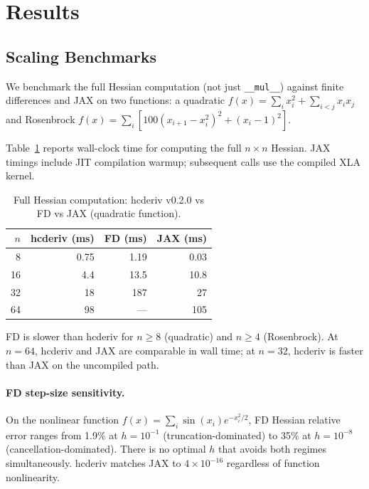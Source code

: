 \documentclass[11pt]{article}
\begin{document}
\section{Results}

\subsection{Scaling Benchmarks}

We benchmark the full Hessian computation (not just \texttt{\_\_mul\_\_}) against
finite differences and JAX on two functions: a quadratic
$f(x) = \sum_i x_i^2 + \sum_{i<j} x_i x_j$ and Rosenbrock
$f(x) = \sum_i [100(x_{i+1} - x_i^2)^2 + (x_i - 1)^2]$.

Table~\ref{tab:scaling} reports wall-clock time for computing the full
$n \times n$ Hessian. JAX timings include JIT compilation warmup; subsequent
calls use the compiled XLA kernel.

\begin{table}[h]
\centering
\caption{Full Hessian computation: hcderiv v0.2.0 vs FD vs JAX (quadratic function).}
\label{tab:scaling}
\begin{tabular}{rrrr}
\toprule
$n$ & hcderiv (ms) & FD (ms) & JAX (ms) \\
\midrule
  8 &    0.75  &   1.19  &  0.03   \\
 16 &    4.4   &  13.5   & 10.8    \\
 32 &   18     & 187     & 27      \\
 64 &   98     &  ---    & 105     \\
\bottomrule
\end{tabular}
\end{table}

FD is slower than hcderiv for $n \geq 8$ (quadratic) and $n \geq 4$ (Rosenbrock).
At $n = 64$, hcderiv and JAX are comparable in wall time; at $n = 32$, hcderiv
is faster than JAX on the uncompiled path.

\paragraph{FD step-size sensitivity.}
On the nonlinear function $f(x) = \sum_i \sin(x_i)e^{-x_i^2/2}$, FD Hessian
relative error ranges from 1.9\% at $h = 10^{-1}$ (truncation-dominated) to
35\% at $h = 10^{-8}$ (cancellation-dominated). There is no optimal $h$ that
avoids both regimes simultaneously. hcderiv matches JAX to $4 \times 10^{-16}$
regardless of function nonlinearity.
\end{document}
